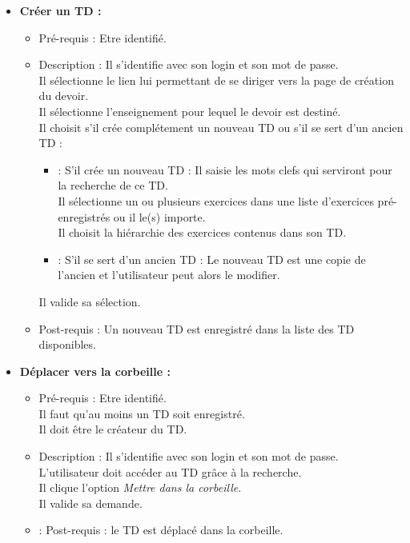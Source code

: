 \begin{itemize}
\item {\bf Cr{\'e}er un TD :}
	\begin{itemize}
	\item Pr{\'e}-requis : Etre identifi{\'e}.
	\item Description : Il s'identifie avec son login et son mot de passe.\\
	Il s{\'e}lectionne le lien lui permettant de se diriger vers la page de cr{\'e}ation du devoir.\\
	Il s{\'e}lectionne l'enseignement pour lequel le devoir est destin{\'e}.\\
	Il choisit s'il cr{\'e}e compl{\'e}tement un nouveau TD ou s'il se sert d'un ancien TD :
	\begin{itemize}
		\item : S'il cr{\'e}e un nouveau TD : Il saisie les mots clefs qui serviront pour la recherche de ce TD.\\
		Il s{\'e}lectionne un ou plusieurs exercices dans une liste d'exercices pr{\'e}-enregistr{\'e}s ou il le(s) importe.\\
		Il choisit la hi{\'e}rarchie des exercices contenus dans son TD.
		\item : S'il se sert d'un ancien TD : Le nouveau TD est une copie de l'ancien et l'utilisateur peut alors le modifier.
	\end{itemize}
	Il valide sa s{\'e}lection.
	\item Post-requis : Un nouveau TD est enregistr{\'e} dans la liste des TD disponibles.\\
	\end{itemize}

\item {\bf D{\'e}placer vers la corbeille :}
	\begin{itemize}
	\item Pr{\'e}-requis : Etre identifi{\'e}.\\
	Il faut qu'au moins un TD soit enregistr{\'e}.\\
	Il doit {\^e}tre le cr{\'e}ateur du TD.
	\item Description : Il s'identifie avec son login et son mot de passe.\\
	L'utilisateur doit acc{\'e}der au TD gr{\^a}ce {\`a} la recherche.\\
	Il clique l'option {\it Mettre dans la corbeille}.\\
	Il valide sa demande.
	\item : Post-requis : le TD est d{\'e}plac{\'e} dans la corbeille.\\
	\end{itemize}

\end{itemize}

